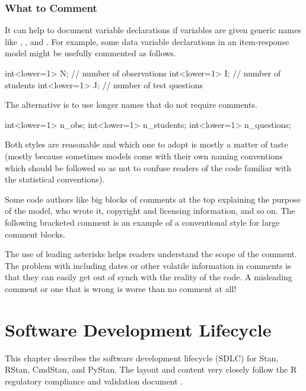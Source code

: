 \subsection{What to Comment}

It can help to document variable declarations if variables are given
generic names like , , and .  For
example, some data variable declarations in an item-response model
might be usefully commented as follows.
%
\begin{stancode}
int<lower=1> N;   // number of observations
int<lower=1> I;   // number of students
int<lower=1> J;   // number of test questions
\end{stancode}
%
The alternative is to use longer names that do not require comments.
%
\begin{stancode}
int<lower=1> n_obs;
int<lower=1> n_students;
int<lower=1> n_questions;
\end{stancode}
%
Both styles are reasonable and which one to adopt is mostly a matter of
taste (mostly because sometimes models come with their own naming
conventions which should be followed so as not to confuse readers of
the code familiar with the statistical conventions).

Some code authors like big blocks of comments at the top explaining
the purpose of the model, who wrote it, copyright and licensing
information, and so on.  The following bracketed comment is an
example of a conventional style for large comment blocks.
%
\begin{stancode}
/*
 * Item-Response Theory PL3 Model
 * -----------------------------------------------------
 * Copyright: Joe Schmoe  <joe@schmoe.com>
 * Date:  19 September 2012
 * License: GPLv3
 */

data {
  // ...
\end{stancode}
%
The use of leading asterisks helps readers understand the scope of the
comment.  The problem with including dates or other volatile
information in comments is that they can easily get out of synch with
the reality of the code.  A misleading comment or one that is wrong is
worse than no comment at all!



\chapter{Software Development Lifecycle}\label{software-development.chapter}

This chapter describes the software development lifecycle (SDLC) for
Stan, RStan, CmdStan, and PyStan. The layout and content very closely
follow the R regulatory compliance and validation document
\citep[Section~6]{RProject:2014}.

